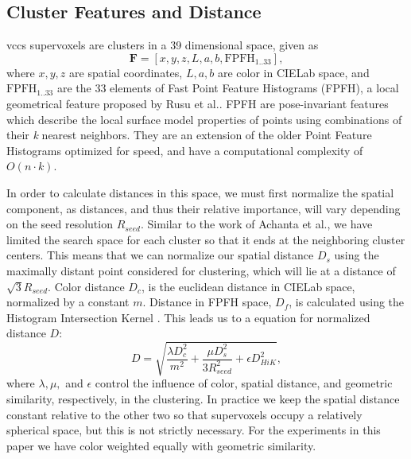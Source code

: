 \subsection{Cluster Features and Distance}
\label{subsec:Features}
\gls{vccs} supervoxels are clusters in a 39 dimensional space, given as 
\begin{equation}
\label{eqn:FeatureSpace}
\mathbf{F} = [x,y,z,L,a,b,\textrm{FPFH}_{1..33}],
\end{equation}
where $x,y,z$ are spatial coordinates, $L,a,b$ are color in CIELab space, and $\textrm{FPFH}_{1..33}$ are the 33 elements of Fast Point Feature Histograms (FPFH), a local geometrical feature proposed by Rusu et al.\@ \cite{FPFH}. FPFH are pose-invariant features which describe the local surface model properties of points using combinations of their \textit{k} nearest neighbors. They are an extension of the older Point Feature Histograms optimized for speed, and have a computational complexity of $O(n \cdot k)$.  

In order to calculate distances in this space, we must first normalize the spatial component, as distances, and thus their relative importance, will vary depending on the seed resolution ${R}_{seed}$. Similar to the work of Achanta et al.\@, \cite{SLICCompared} we have limited the search space for each cluster so that it ends at the neighboring cluster centers. This means that we can normalize our spatial distance $D_s$ using the maximally distant point considered for clustering, which will lie at a distance of $\sqrt{3} {R}_{seed}$. Color distance $D_c$, is the euclidean distance in CIELab space, normalized by a constant $m$. Distance in FPFH space, $D_f$, is calculated using the Histogram Intersection Kernel \cite{HistogramIntersection}. This leads us to a equation for normalized distance $D$:
\begin{equation}
\label{eqn:Distance}
D = \sqrt{\frac{\lambda D_c^2}{m^2}+\frac{\mu D_s^2}{3 {R}_{seed}^{2}}+\epsilon {D}_{HiK}^{2}},
\end{equation}
where $\lambda,\mu,$ and $\epsilon$ control the influence of color, spatial distance, and geometric similarity, respectively, in the clustering. In practice we keep the spatial distance constant relative to the other two so that supervoxels occupy a relatively spherical space, but this is not strictly necessary. For the experiments in this paper we have color weighted equally with geometric similarity.

